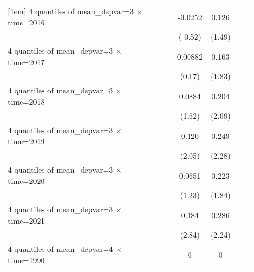 \begin{table}[htbp]
\begin{tabular}{l*{6}{c}}
[1em]
4 quantiles of mean\_depvar=3 $\times$ time=2016&                     &                     &     -0.0252         &       0.126         &                     &                     \\
                    &                     &                     &     (-0.52)         &      (1.49)         &                     &                     \\
[1em]
4 quantiles of mean\_depvar=3 $\times$ time=2017&                     &                     &     0.00882         &       0.163\sym{*}  &                     &                     \\
                    &                     &                     &      (0.17)         &      (1.83)         &                     &                     \\
[1em]
4 quantiles of mean\_depvar=3 $\times$ time=2018&                     &                     &      0.0884         &       0.204\sym{**} &                     &                     \\
                    &                     &                     &      (1.62)         &      (2.09)         &                     &                     \\
[1em]
4 quantiles of mean\_depvar=3 $\times$ time=2019&                     &                     &       0.120\sym{*}  &       0.249\sym{**} &                     &                     \\
                    &                     &                     &      (2.05)         &      (2.28)         &                     &                     \\
[1em]
4 quantiles of mean\_depvar=3 $\times$ time=2020&                     &                     &      0.0651         &       0.223\sym{*}  &                     &                     \\
                    &                     &                     &      (1.23)         &      (1.84)         &                     &                     \\
[1em]
4 quantiles of mean\_depvar=3 $\times$ time=2021&                     &                     &       0.184\sym{***}&       0.286\sym{**} &                     &                     \\
                    &                     &                     &      (2.84)         &      (2.24)         &                     &                     \\
[1em]
4 quantiles of mean\_depvar=4 $\times$ time=1990&                     &                     &           0         &           0         &                     &                     \\

\end{tabular}
\end{table}
